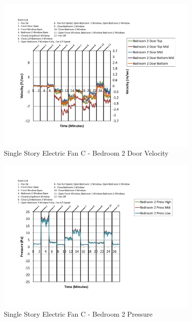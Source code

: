 \documentclass{article}
\begin{document}
\begin{appendices}
	\begin{figure}[H]
		\centering
		\includegraphics[height=3.05in,trim=0.67in 1.1in 0.67in 0.8in,clip=true]{0_Images/Results_Charts/ColdFlow/Single_Story/Electric/C/Bedroom_2_Door_Velocity.pdf}
		\caption{Single Story Electric Fan C - Bedroom 2 Door Velocity}
	\end{figure}
 

	\begin{figure}[H]
		\centering
		\includegraphics[height=3.05in,trim=0.67in 1.1in 0.67in 0.8in,clip=true]{0_Images/Results_Charts/ColdFlow/Single_Story/Electric/C/Bedroom_2_Pressure.pdf}
		\caption{Single Story Electric Fan C - Bedroom 2 Pressure}
	\end{figure}
 
	\clearpage


\end{appendices}
\end{document}
